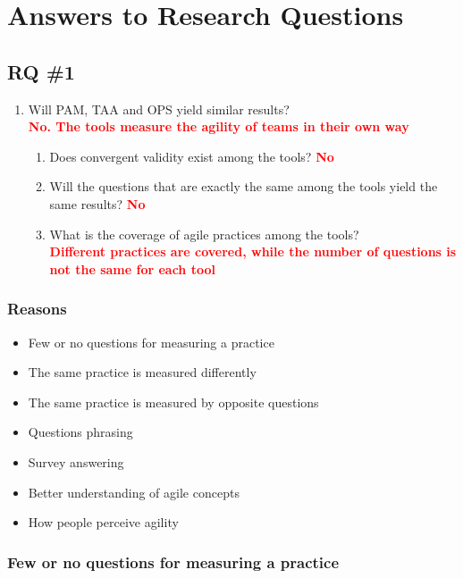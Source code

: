 \section{Answers to Research Questions}

\subsection*{RQ \#1}

\begin{enumerate}
	\item Will PAM, TAA and OPS yield similar results? \\ \textcolor{red}{\textbf{No. The tools measure the agility of teams in their own way}}
    \setcounter{enumTemp}{\theenumi}
	\begin{enumerate}[label*=\arabic*.]
		\item Does convergent validity exist among the tools? \textcolor{red}{\textbf{No}}
		\item Will the questions that are exactly the same among the tools yield the same results? \textcolor{red}{\textbf{No}}
		\item What is the coverage of agile practices among the tools? \\ \textcolor{red}{\textbf{Different practices are covered, while the number of questions is not the same for each tool}}
	\end{enumerate}
\end{enumerate}

\subsubsection*{Reasons}

\begin{itemize}
	\item Few or no questions for measuring a practice
	\item The same practice is measured differently
	\item The same practice is measured by opposite questions
	\item Questions phrasing
	\item Survey answering
	\item Better understanding of agile concepts
	\item How people perceive agility
\end{itemize}

\clearpage

\subsubsection*{Few or no questions for measuring a practice}

